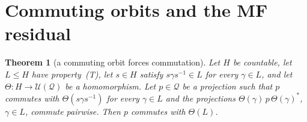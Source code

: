 \documentclass[11pt]{amsart}
\newcommand{\leanverified}[2]{\ignorespaces}
\newtheorem{theorem}{Theorem}[section]
\theoremstyle{definition}
\theoremstyle{remark}
\theoremstyle{plain}
\newcommand{\U}{\mathcal U}
\begin{document}
\section{Commuting orbits and the MF residual}\label{subsec:collapse}

\begin{theorem}[a commuting orbit forces commutation]\label{thm:projection-collapse}
Let $H$ be countable, let $L\le H$ have property~\textup{(T)}, let
$s\in H$ satisfy $s\gamma s^{-1}\in L$ for every $\gamma\in L$, and let
$\Theta\colon H\to\U(\mathcal Q)$ be a homomorphism.  Let
$p\in\mathcal Q$ be a projection such that $p$ commutes with
$\Theta(s\gamma s^{-1})$ for every $\gamma\in L$ and the projections
$\Theta(\gamma)\,p\,\Theta(\gamma)^*$, $\gamma\in L$, commute pairwise.
Then $p$ commutes with $\Theta(L)$.
\leanverified{Sofic/ProjectionCompressionCollapse}{GroupApproximation.ProjectionCompressionCollapse.corona_projection_collapse}
\end{theorem}
\end{document}
